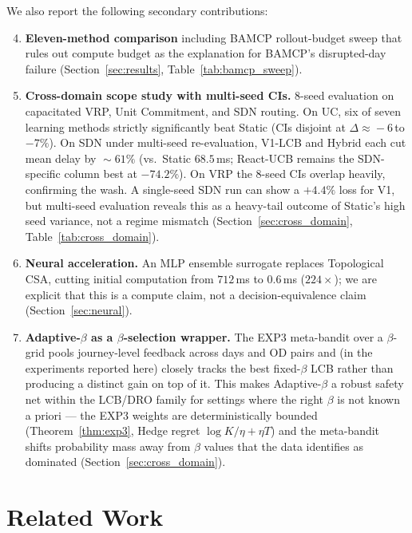 \documentclass[11pt]{article}
\theoremstyle{definition}
\theoremstyle{remark}
\begin{document}
We also report the following secondary contributions:

\begin{enumerate}\setcounter{enumi}{3}
\item \textbf{Eleven-method comparison} including BAMCP rollout-budget
sweep that rules out compute budget as the explanation for BAMCP's
disrupted-day failure (Section~\ref{sec:results}, Table~\ref{tab:bamcp_sweep}).
\item \textbf{Cross-domain scope study with multi-seed CIs.} 8-seed
evaluation on capacitated VRP, Unit Commitment, and SDN routing.
On UC, six of seven learning methods strictly significantly beat
Static (CIs disjoint at $\Delta\!\approx\!-6$\,to\,$-7\%$). On SDN
under multi-seed re-evaluation, V1-LCB and Hybrid each cut mean
delay by $\!\sim\!61\%$ (vs.\ Static $68.5$\,ms; React-UCB
remains the SDN-specific column best at $-74.2\%$). On VRP the
8-seed CIs overlap heavily, confirming the wash. A single-seed
SDN run can show a $+4.4\%$ loss for V1, but multi-seed
evaluation reveals this as a heavy-tail outcome of Static's
high seed variance, not a regime mismatch
(Section~\ref{sec:cross_domain}, Table~\ref{tab:cross_domain}).
\item \textbf{Neural acceleration.} An MLP ensemble surrogate
replaces Topological CSA, cutting initial computation from
$712$\,ms to $0.6$\,ms ($224\times$); we are explicit that this is a
compute claim, not a decision-equivalence claim
(Section~\ref{sec:neural}).
\item \textbf{Adaptive-$\beta$ as a $\beta$-selection wrapper.} The
EXP3 meta-bandit over a $\beta$-grid pools journey-level feedback
across days and OD pairs and (in the experiments reported here)
closely tracks the best fixed-$\beta$ LCB rather than producing a
distinct gain on top of it. This makes Adaptive-$\beta$ a robust
safety net within the LCB/DRO family for settings where the right
$\beta$ is not known a priori --- the EXP3 weights are
deterministically bounded (Theorem~\ref{thm:exp3}, Hedge regret
$\log K/\eta + \eta T$) and the meta-bandit shifts probability mass
away from $\beta$ values that the data identifies as dominated
(Section~\ref{sec:cross_domain}).
\end{enumerate}

\section{Related Work}
\label{sec:related}
\end{document}
